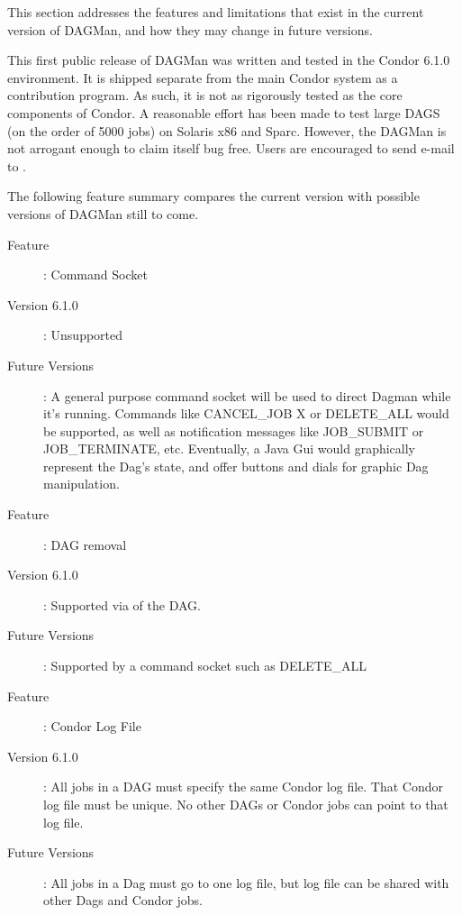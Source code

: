 This section addresses the features and limitations that exist in the current
version of DAGMan, and how they may change in future versions.

This first public release of DAGMan was written and tested in the Condor 6.1.0
environment.  It is shipped separate from the main Condor system as a
contribution program.  As such, it is not as rigorously tested as the core
components of Condor.  A reasonable effort has been made to test large DAGS
(on the order of 5000 jobs) on Solaris x86 and Sparc.  However, the DAGMan is
not arrogant enough to claim itself bug free.  Users are encouraged to send
e-mail to .

The following feature summary compares the current version with possible
versions of DAGMan still to come.

\begin{description}
\item[Feature] : Command Socket
\item[Version 6.1.0] : Unsupported
\item[Future Versions] : A general purpose command socket will be used to
direct Dagman while it's running.  Commands like CANCEL\_JOB X or DELETE\_ALL
would be supported, as well as notification messages like JOB\_SUBMIT or
JOB\_TERMINATE, etc.  Eventually, a Java Gui would graphically represent the
Dag's state, and offer buttons and dials for graphic Dag manipulation.
\end{description}

\begin{description}
\item[Feature]: DAG removal
\item[Version 6.1.0]: Supported via  of the DAG.
\item[Future Versions]: Supported by a command socket such as DELETE\_ALL
\end{description}

\begin{description}
\item[Feature]: Condor Log File
\item[Version 6.1.0]: All jobs in a DAG must specify the same Condor log file.
That Condor log file must be unique.  No other DAGs or Condor jobs can point
to that log file.
\item[Future Versions]: All jobs in a Dag must go to one log file, but
log file can be shared with other Dags and Condor jobs.
\end{description}

